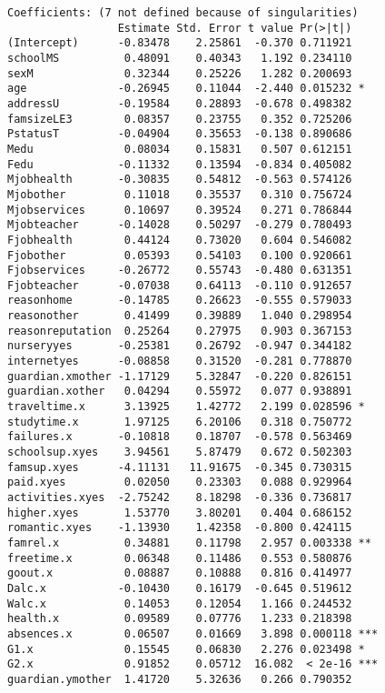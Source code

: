\documentclass[11pt]{article}
\begin{document}
\begin{enumerate}
\begin{verbatim}
Coefficients: (7 not defined because of singularities)
                 Estimate Std. Error t value Pr(>|t|)    
(Intercept)      -0.83478    2.25861  -0.370 0.711921    
schoolMS          0.48091    0.40343   1.192 0.234110    
sexM              0.32344    0.25226   1.282 0.200693    
age              -0.26945    0.11044  -2.440 0.015232 *  
addressU         -0.19584    0.28893  -0.678 0.498382    
famsizeLE3        0.08357    0.23755   0.352 0.725206    
PstatusT         -0.04904    0.35653  -0.138 0.890686    
Medu              0.08034    0.15831   0.507 0.612151    
Fedu             -0.11332    0.13594  -0.834 0.405082    
Mjobhealth       -0.30835    0.54812  -0.563 0.574126    
Mjobother         0.11018    0.35537   0.310 0.756724    
Mjobservices      0.10697    0.39524   0.271 0.786844    
Mjobteacher      -0.14028    0.50297  -0.279 0.780493    
Fjobhealth        0.44124    0.73020   0.604 0.546082    
Fjobother         0.05393    0.54103   0.100 0.920661    
Fjobservices     -0.26772    0.55743  -0.480 0.631351    
Fjobteacher      -0.07038    0.64113  -0.110 0.912657    
reasonhome       -0.14785    0.26623  -0.555 0.579033    
reasonother       0.41499    0.39889   1.040 0.298954    
reasonreputation  0.25264    0.27975   0.903 0.367153    
nurseryyes       -0.25381    0.26792  -0.947 0.344182    
internetyes      -0.08858    0.31520  -0.281 0.778870    
guardian.xmother -1.17129    5.32847  -0.220 0.826151    
guardian.xother   0.04294    0.55972   0.077 0.938891    
traveltime.x      3.13925    1.42772   2.199 0.028596 *  
studytime.x       1.97125    6.20106   0.318 0.750772    
failures.x       -0.10818    0.18707  -0.578 0.563469    
schoolsup.xyes    3.94561    5.87479   0.672 0.502303    
famsup.xyes      -4.11131   11.91675  -0.345 0.730315    
paid.xyes         0.02050    0.23303   0.088 0.929964    
activities.xyes  -2.75242    8.18298  -0.336 0.736817    
higher.xyes       1.53770    3.80201   0.404 0.686152    
romantic.xyes    -1.13930    1.42358  -0.800 0.424115    
famrel.x          0.34881    0.11798   2.957 0.003338 ** 
freetime.x        0.06348    0.11486   0.553 0.580876    
goout.x           0.08887    0.10888   0.816 0.414977    
Dalc.x           -0.10430    0.16179  -0.645 0.519612    
Walc.x            0.14053    0.12054   1.166 0.244532    
health.x          0.09589    0.07776   1.233 0.218398    
absences.x        0.06507    0.01669   3.898 0.000118 ***
G1.x              0.15545    0.06830   2.276 0.023498 *  
G2.x              0.91852    0.05712  16.082  < 2e-16 ***
guardian.ymother  1.41720    5.32636   0.266 0.790352    

\end{verbatim}
\end{enumerate}
\end{document}
